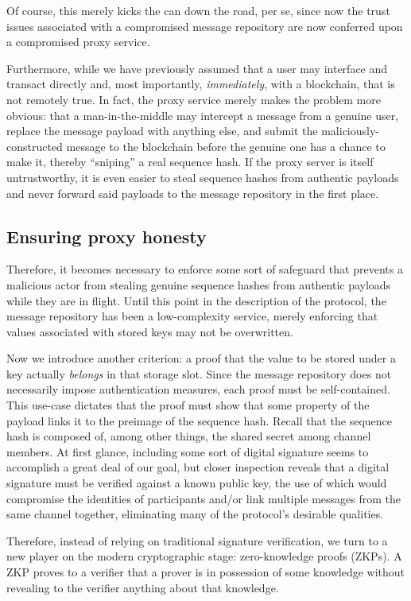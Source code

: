 Of course, this merely kicks the can down the road, per se, since now the trust issues associated with a compromised message repository are now conferred upon a compromised proxy service.

Furthermore, while we have previously assumed that a user may interface and transact directly and, most importantly, \emph{immediately}, with a blockchain, that is not remotely true. In fact, the proxy service merely makes the problem more obvious: that a man-in-the-middle may intercept a message from a genuine user, replace the message payload with anything else, and submit the maliciously-constructed message to the blockchain before the genuine one has a chance to make it, thereby ``sniping'' a real sequence hash. If the proxy server is itself untrustworthy, it is even easier to steal sequence hashes from authentic payloads and never forward said payloads to the message repository in the first place.

\subsection{Ensuring proxy honesty}\label{ensuring-proxy-honesty}

Therefore, it becomes necessary to enforce some sort of safeguard that prevents a malicious actor from stealing genuine sequence hashes from authentic payloads while they are in flight. Until this point in the description of the protocol, the message repository has been a low-complexity service, merely enforcing that values associated with stored keys may not be overwritten.

Now we introduce another criterion: a proof that the value to be stored under a key actually \emph{belongs} in that storage slot. Since the message repository does not necessarily impose authentication measures, each proof must be self-contained. This use-case dictates that the proof must show that some property of the payload links it to the preimage of the sequence hash. Recall that the sequence hash is composed of, among other things, the shared secret among channel members. At first glance, including some sort of digital signature seems to accomplish a great deal of our goal, but closer inspection reveals that a digital signature must be verified against a known public key, the use of which would compromise the identities of participants and/or link multiple messages from the same channel together, eliminating many of the protocol's desirable qualities.

Therefore, instead of relying on traditional signature verification, we turn to a new player on the modern cryptographic stage: zero-knowledge proofs (ZKPs). A ZKP proves to a verifier that a prover is in possession of some knowledge without revealing to the verifier anything about that knowledge. \parencite{goldwasser_knowledge_1985}

